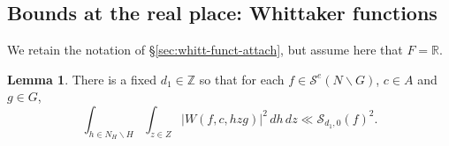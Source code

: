 \documentclass[reqno]{amsart}
\theoremstyle{plain} \newtheorem{theorem} {Theorem}
\theoremstyle{definition} \newtheorem{definition} [theorem] {Definition}
\theoremstyle{itplain} %
\newtheorem{lemma}[theorem]{Lemma}
\numberwithin{equation}{section}
\numberwithin{theorem}{section}
\begin{document}
\subsection{Bounds at the real place: Whittaker functions}\label{sec:bounds-at-real}
We retain the notation of \S\ref{sec:whitt-funct-attach}, but assume here that $F = \mathbb{R}$.

\begin{lemma}\label{lem:integrate-by-parts-archimedean-whittaker-average-bound}
  There is a fixed $d_1 \in \mathbb{Z}$ so that for each $f \in \mathcal{S}^e(N \backslash G)$, $c \in A$ and $g \in G$, 
\begin{equation*}
  \int _{h \in N_H \backslash H}
  \int _{z \in Z}|W(f,c, h z g)|^2  \, d h \, d z \ll  \mathcal{S}_{d_1,0}(f)^2.
\end{equation*}
\end{lemma}
\end{document}
